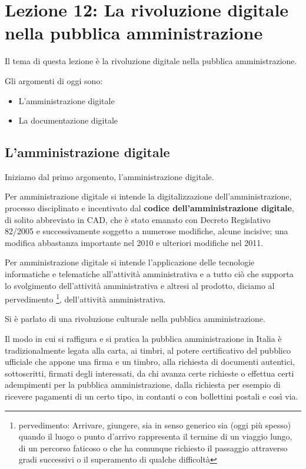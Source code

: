 \chapter{Lezione 12: La rivoluzione digitale nella pubblica amministrazione}

Il tema di questa lezione è la rivoluzione digitale nella pubblica amministrazione. 

Gli argomenti di oggi sono:
\begin{itemize}
    \item L'amministrazione digitale
    \item La documentazione digitale
\end{itemize}

\section{L'amministrazione digitale}

Iniziamo dal primo argomento, l'amministrazione digitale. 

Per amministrazione digitale si intende la digitalizzazione dell'amministrazione, processo disciplinato e incentivato dal \textbf{codice dell'amministrazione digitale}, di solito abbreviato in CAD, che è stato emanato con Decreto Regislativo 82/2005 e successivamente soggetto a numerose modifiche, alcune incisive; una modifica abbastanza importante nel 2010 e ulteriori modifiche nel 2011.

Per amministrazione digitale si intende l'applicazione delle tecnologie informatiche e telematiche all'attività amministrativa e a tutto ciò che supporta lo svolgimento dell'attività amministrativa e altresi al prodotto, diciamo al pervedimento \footnote{pervedimento: Arrivare, giungere, sia in senso generico sia (oggi più spesso) quando il luogo o punto d'arrivo rappresenta il termine di un viaggio lungo, di un percorso faticoso o che ha comunque richiesto il passaggio attraverso gradi successivi o il superamento di qualche difficoltà}, dell'attività amministrativa.

Si è parlato di una rivoluzione culturale nella pubblica amministrazione. 

Il modo in cui si raffigura e si pratica la pubblica amministrazione in Italia è tradizionalmente legata alla carta, ai timbri, al potere certificativo del pubblico ufficiale che appone una firma e un timbro, alla richiesta di documenti autentici, sottoscritti, firmati degli interessati, da chi avanza certe richieste o effettua certi adempimenti per la pubblica amministrazione, dalla richiesta per esempio di ricevere pagamenti di un certo tipo, in contanti o con bollettini postali e così via.

